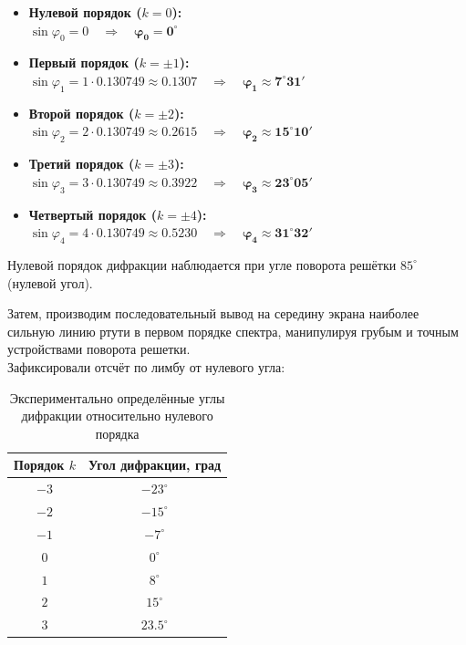 \documentclass[12pt,a5paper,titlepage, main = russian]{article}
\begin{document}
\begin{itemize}
    \item \textbf{Нулевой порядок ($k = 0$):} \\
    $\sin\varphi_0 = 0 \quad \Rightarrow \quad \mathbf{\varphi_0 = 0^\circ}$
    
    \item \textbf{Первый порядок ($k = \pm 1$):} \\
    $\sin\varphi_1 = 1 \cdot 0.130749 \approx 0.1307 \quad \Rightarrow \quad \mathbf{\varphi_1 \approx 7^\circ 31'}$
    
    \item \textbf{Второй порядок ($k = \pm 2$):} \\
    $\sin\varphi_2 = 2 \cdot 0.130749 \approx 0.2615 \quad \Rightarrow \quad \mathbf{\varphi_2 \approx 15^\circ 10'}$
    
    \item \textbf{Третий порядок ($k = \pm 3$):} \\
    $\sin\varphi_3 = 3 \cdot 0.130749 \approx 0.3922 \quad \Rightarrow \quad \mathbf{\varphi_3 \approx 23^\circ 05'}$
    
    \item \textbf{Четвертый порядок ($k = \pm 4$):} \\
    $\sin\varphi_4 = 4 \cdot 0.130749 \approx 0.5230 \quad \Rightarrow \quad \mathbf{\varphi_4 \approx 31^\circ 32'}$
\end{itemize}

Нулевой порядок дифракции наблюдается при угле поворота решётки $85^\circ$ (нулевой угол).

Затем, производим последовательный вывод на середину экрана наиболее сильную линию ртути в первом порядке спектра, манипулируя
грубым и точным устройствами поворота решетки. \\
Зафиксировали отсчёт по лимбу от нулевого угла:
\begin{table}[H]
\centering
\begin{tabular}{|c|c|}
\hline
Порядок $k$ & Угол дифракции, град \\
\hline
$-3$ & $-23^\circ$ \\
$-2$ & $-15^\circ$ \\
$-1$ & $-7^\circ$ \\
$0$  & $0^\circ$ \\
$1$  & $8^\circ$ \\
$2$  & $15^\circ$ \\
$3$  & $23.5^\circ$ \\
\hline
\end{tabular}
\caption{Экспериментально определённые углы дифракции относительно нулевого порядка}
\end{table}
\end{document}
